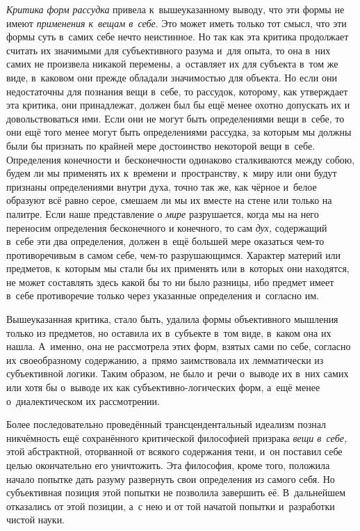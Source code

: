 {\em Критика форм рассудка} привела к~вышеуказанному
выводу, что эти формы не имеют {\em применения к~вещам
в~себе}. Это может иметь только тот смысл, что эти формы суть в~самих себе
нечто неистинное. Но так как эта критика продолжает считать их значимыми
для субъективного разума и~для опыта, то она в~них самих не произвела
никакой перемены, а~оставляет их для субъекта в~том же виде, в~каковом они
прежде обладали значимостью для объекта. Но если они недостаточны для
познания вещи в~себе, то рассудок, которому, как утверждает эта критика,
они принадлежат, должен был бы ещё менее охотно допускать их и
довольствоваться ими. Если они не могут быть определениями вещи в~себе, то
они ещё того менее могут быть определениями рассудка, за которым мы должны
были бы признать по крайней мере достоинство некоторой вещи в~себе.
Определения конечности и~бесконечности одинаково сталкиваются между собою,
будем ли мы применять их к~времени и~пространству, к~миру или они будут
признаны определениями внутри духа, точно так же, как чёрное и~белое
образуют всё равно серое, смешаем ли мы их вместе на стене или только на
палитре. Если наше представление о {\em мире}
разрушается, когда мы на него переносим определения бесконечного и
конечного, то сам {\em дух,} содержащий в~себе эти два
определения, должен в~ещё большей мере оказаться чем-то противоречивым в
самом себе, чем-то разрушающимся. Характер материй или предметов, к~которым
мы стали бы их применять или в~которых они находятся, не может составлять
здесь какой бы то ни было разницы, ибо предмет имеет в~себе противоречие
только через указанные определения и~согласно им.

Вышеуказанная критика, стало быть, удалила формы объективного мышления
только из предметов, но оставила их в~субъекте в~том виде, в~каком она их
нашла. А~именно, она не рассмотрела этих форм, взятых сами по себе,
согласно их своеобразному содержанию, а~прямо заимствовала их лемматически
из субъективной логики. Таким образом, не было и~речи о~выводе их в~них
самих или хотя бы о~выводе их как субъективно-логических форм, а~ещё менее
о~диалектическом их рассмотрении.

Более последовательно проведённый трансцендентальный идеализм познал
никчёмность ещё сохранённого критической философией призрака
{\em вещи в~себе,} этой абстрактной, оторванной от
всякого содержания тени, и~он поставил себе целью окончательно его
уничтожить.
Эта философия, кроме того, положила начало попытке дать разуму развернуть
свои определения из самого себя. Но субъективная позиция этой попытки не
позволила завершить её. В~дальнейшем отказались от этой позиции, а~с нею и
от той начатой попытки и~разработки чистой науки.

